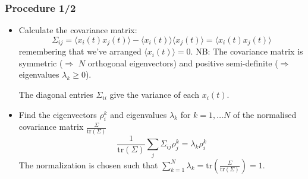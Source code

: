 \documentclass[10pt,aspectratio=169,dvipsnames]{beamer}
\def\l{\lambda}
\let\olditem\item
\renewcommand{\item}{%
\olditem\vspace{5pt}}
\begin{document}
\begin{frame}
  \frametitle{Procedure 1/2}

  \begin{itemize}
  \item Calculate the \alert{covariance matrix}:
    \begin{equation*}
      \Sigma_{ij} = \langle x_i(t) x_j(t) \rangle -\langle x_i(t) \rangle \langle x_j (t) \rangle = \langle x_i(t) x_j(t) \rangle
    \end{equation*}
    remembering that we've arranged $\langle x_i(t) \rangle = 0$. NB: The covariance matrix is \alert{symmetric} ($\Rightarrow$ $N$ orthogonal eigenvectors) and \alert{positive semi-definite} ($\Rightarrow$ eigenvalues $\l_k \geq 0$).

    The diagonal entries $\Sigma_{ii}$ give the variance of each $x_i(t)$.

  \item Find the \alert{eigenvectors} $\rho^k_i$ and \alert{eigenvalues} $\lambda_k$ for $k=1,\dots N$ of the \alert{normalised covariance matrix} $\frac{\Sigma}{\textrm{tr}(\Sigma)}$
    \begin{equation*}
      \frac{1}{\textrm{tr}(\Sigma)}\sum_j \Sigma_{ij} \rho^k_j = \lambda_k \rho^k_i
    \end{equation*}
    The normalization is chosen such that $\sum_{k=1}^N \lambda_k = \textrm{tr} \left(\frac{\Sigma}{\textrm{tr}(\Sigma)}\right) = 1$.
  \end{itemize}

\end{frame}
\end{document}

